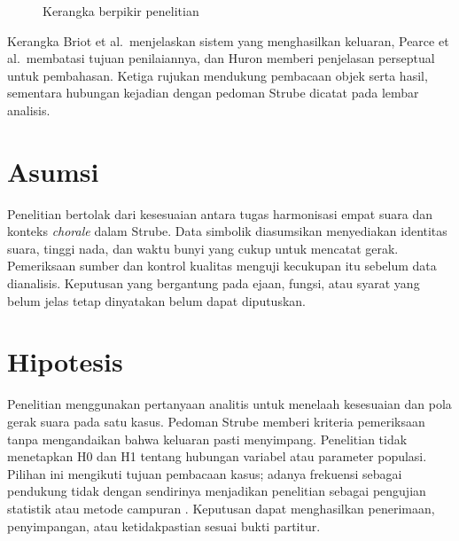 \begin{figure}[htbp]
\centering
{}
\caption{Kerangka berpikir penelitian}
\label{fig:kerangka-berpikir}
\end{figure}

Kerangka Briot et al.\ menjelaskan sistem yang menghasilkan keluaran, Pearce et al.\ membatasi tujuan penilaiannya, dan Huron memberi penjelasan perseptual untuk pembahasan. Ketiga rujukan mendukung pembacaan objek serta hasil, sementara hubungan kejadian dengan pedoman Strube dicatat pada lembar analisis.

\section{Asumsi}\label{sec:asumsi}

Penelitian bertolak dari kesesuaian antara tugas harmonisasi empat suara dan konteks \textit{chorale} dalam Strube. Data simbolik diasumsikan menyediakan identitas suara, tinggi nada, dan waktu bunyi yang cukup untuk mencatat gerak. Pemeriksaan sumber dan kontrol kualitas menguji kecukupan itu sebelum data dianalisis. Keputusan yang bergantung pada ejaan, fungsi, atau syarat yang belum jelas tetap dinyatakan belum dapat diputuskan.

\section{Hipotesis}\label{sec:hipotesis}

Penelitian menggunakan pertanyaan analitis untuk menelaah kesesuaian dan pola gerak suara pada satu kasus. Pedoman Strube memberi kriteria pemeriksaan tanpa mengandaikan bahwa keluaran pasti menyimpang. Penelitian tidak menetapkan H0 dan H1 tentang hubungan variabel atau parameter populasi. Pilihan ini mengikuti tujuan pembacaan kasus; adanya frekuensi sebagai pendukung tidak dengan sendirinya menjadikan penelitian sebagai pengujian statistik atau metode campuran \parencite[475--478]{maxwell2010}. Keputusan dapat menghasilkan penerimaan, penyimpangan, atau ketidakpastian sesuai bukti partitur.
